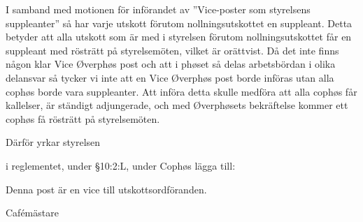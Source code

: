 \documentclass[../_main/handlingar.tex]{subfiles}
\begin{document}

I samband med motionen för införandet av ”Vice-poster som styrelsens suppleanter” så har varje utskott förutom nollningsutskottet en suppleant. Detta betyder att alla utskott som är med i styrelsen förutom nollningsutskottet får en suppleant med rösträtt på styrelsemöten, vilket är orättvist. Då det inte finns någon klar Vice Øverphøs post och att i phøset så delas arbetsbördan i olika delansvar så tycker vi inte att en Vice Øverphøs post borde införas utan alla cophøs borde vara suppleanter. Att införa detta skulle medföra att alla cophøs får kallelser, är ständigt adjungerade, och med Øverphøsets bekräftelse kommer ett cophøs få rösträtt på styrelsemöten. 

Därför yrkar styrelsen
\begin{attsatser}
    \att i reglementet, under §10:2:L, under Cophøs lägga till: 

    \begin{dashlist}
          \item Denna post är en vice till utskottsordföranden.
     \end{dashlist}


\end{attsatser}

\begin{signatures}{1}
    \ist
    \signature{\cafem}{Cafémästare}
\end{signatures}
\end{document}
